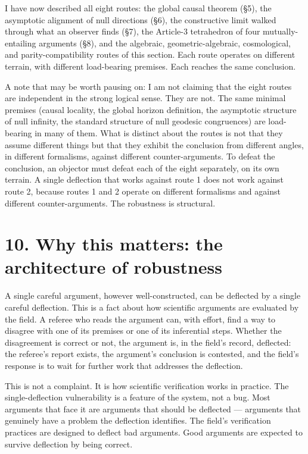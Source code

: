\documentclass[11pt,a4paper]{article}
\begin{document}
I have now described all eight routes: the global causal theorem (§5), the asymptotic alignment of null directions (§6), the constructive limit walked through what an observer finds (§7), the Article-3 tetrahedron of four mutually-entailing arguments (§8), and the algebraic, geometric-algebraic, cosmological, and parity-compatibility routes of this section. Each route operates on different terrain, with different load-bearing premises. Each reaches the same conclusion.

A note that may be worth pausing on: I am not claiming that the eight routes are independent in the strong logical sense. They are not. The same minimal premises (causal locality, the global horizon definition, the asymptotic structure of null infinity, the standard structure of null geodesic congruences) are load-bearing in many of them. What is distinct about the routes is not that they assume different things but that they exhibit the conclusion from different angles, in different formalisms, against different counter-arguments. To defeat the conclusion, an objector must defeat each of the eight separately, on its own terrain. A single deflection that works against route 1 does not work against route 2, because routes 1 and 2 operate on different formalisms and against different counter-arguments. The robustness is structural.

\section*{10. Why this matters: the architecture of robustness}

A single careful argument, however well-constructed, can be deflected by a single careful deflection. This is a fact about how scientific arguments are evaluated by the field. A referee who reads the argument can, with effort, find a way to disagree with one of its premises or one of its inferential steps. Whether the disagreement is correct or not, the argument is, in the field's record, deflected: the referee's report exists, the argument's conclusion is contested, and the field's response is to wait for further work that addresses the deflection.

This is not a complaint. It is how scientific verification works in practice. The single-deflection vulnerability is a feature of the system, not a bug. Most arguments that face it are arguments that should be deflected --- arguments that genuinely have a problem the deflection identifies. The field's verification practices are designed to deflect bad arguments. Good arguments are expected to survive deflection by being correct.
\end{document}
